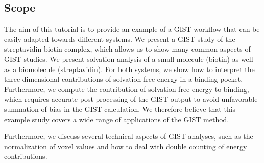 \documentclass[9pt,tutorial]{livecoms}
\begin{document}
%
%
%

\subsection{Scope}
The aim of this tutorial is to provide an example of a GIST workflow that can be easily adapted towards different systems.
We present a GIST study of the streptavidin-biotin complex, which allows us to show many common aspects of GIST studies.
We present solvation analysis of a small molecule (biotin) as well as a biomolecule (streptavidin).
For both systems, we show how to interpret the three-dimensional contributions of solvation free energy in a binding pocket.
Furthermore, we compute the contribution of solvation free energy to binding, which requires accurate post-processing of the GIST output to avoid unfavorable summation of bias in the GIST calculation.
We therefore believe that this example study covers a wide range of applications of the GIST method.

Furthermore, we discuss several technical aspects of GIST analyses, such as the normalization of voxel values and how to deal with double counting of energy contributions. 
%
\end{document}
